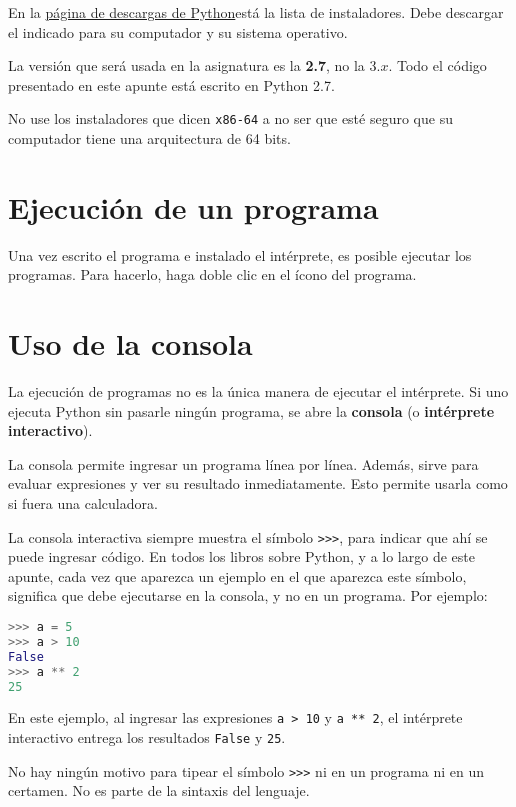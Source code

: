 En la \href{http://www.python.org/download/}{página de descargas de
Python}\footnotemark está la lista de instaladores. Debe descargar el indicado para
su computador y su sistema operativo.


La versión que será usada en la asignatura es la \textbf{2.7}, no la 3.\(x\).
Todo el código presentado en este apunte está escrito en Python 2.7.

No use los instaladores que dicen \lstinline!x86-64! a no ser que esté
seguro que su computador tiene una arquitectura de 64 bits.

\section{Ejecución de un programa}

Una vez escrito el programa e instalado el intérprete, es posible
ejecutar los programas. Para hacerlo, haga doble clic en el ícono del
programa.

\section{Uso de la consola}

La ejecución de programas no es la única manera de ejecutar el
intérprete. Si uno ejecuta Python sin pasarle ningún programa, se abre
la \textbf{consola} (o \textbf{intérprete interactivo}).

La consola permite ingresar un programa línea por línea. Además, sirve
para evaluar expresiones y ver su resultado inmediatamente. Esto permite
usarla como si fuera una calculadora.

La consola interactiva siempre muestra el símbolo \lstinline!>>>!, para
indicar que ahí se puede ingresar código. En todos los libros sobre
Python, y a lo largo de este apunte, cada vez que aparezca un ejemplo en
el que aparezca este símbolo, significa que debe ejecutarse en la
consola, y no en un programa. Por ejemplo:

\begin{lstlisting}[language=py]
>>> a = 5
>>> a > 10
False
>>> a ** 2
25
\end{lstlisting}

En este ejemplo, al ingresar las expresiones \lstinline!a > 10! y
\lstinline!a ** 2!, el intérprete interactivo entrega los resultados
\lstinline!False! y \lstinline!25!.

No hay ningún motivo para tipear el símbolo \lstinline!>>>! ni en un
programa ni en un certamen. No es parte de la sintaxis del
lenguaje.

